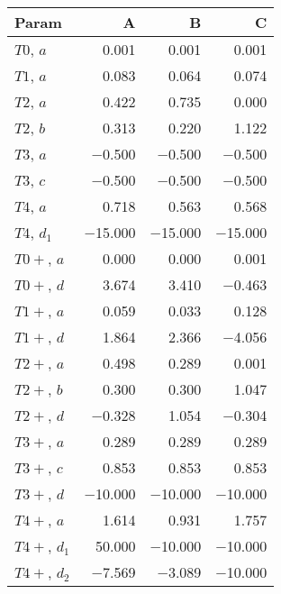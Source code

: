 \begin{tabular}{lrrr}
\toprule
 Param        &       A &       B &       C \\
\midrule
 $T0$, $a$    &   \num{0.001} &   \num{0.001} &   \num{0.001} \\
 $T1$, $a$    &   \num{0.083} &   \num{0.064} &   \num{0.074} \\
 $T2$, $a$    &   \num{0.422} &   \num{0.735} &   \num{0.000} \\
 $T2$, $b$    &   \num{0.313} &   \num{0.220} &   \num{1.122} \\
 $T3$, $a$    &  \num{-0.500} &  \num{-0.500} &  \num{-0.500} \\
 $T3$, $c$    &  \num{-0.500} &  \num{-0.500} &  \num{-0.500} \\
 $T4$, $a$    &   \num{0.718} &   \num{0.563} &   \num{0.568} \\
 $T4$, $d_1$  & \num{-15.000} & \num{-15.000} & \num{-15.000} \\
 $T0+$, $a$   &   \num{0.000} &   \num{0.000} &   \num{0.001} \\
 $T0+$, $d$   &   \num{3.674} &   \num{3.410} &  \num{-0.463} \\
 $T1+$, $a$   &   \num{0.059} &   \num{0.033} &   \num{0.128} \\
 $T1+$, $d$   &   \num{1.864} &   \num{2.366} &  \num{-4.056} \\
 $T2+$, $a$   &   \num{0.498} &   \num{0.289} &   \num{0.001} \\
 $T2+$, $b$   &   \num{0.300} &   \num{0.300} &   \num{1.047} \\
 $T2+$, $d$   &  \num{-0.328} &   \num{1.054} &  \num{-0.304} \\
 $T3+$, $a$   &   \num{0.289} &   \num{0.289} &   \num{0.289} \\
 $T3+$, $c$   &   \num{0.853} &   \num{0.853} &   \num{0.853} \\
 $T3+$, $d$   & \num{-10.000} & \num{-10.000} & \num{-10.000} \\
 $T4+$, $a$   &   \num{1.614} &   \num{0.931} &   \num{1.757} \\
 $T4+$, $d_1$ &  \num{50.000} & \num{-10.000} & \num{-10.000} \\
 $T4+$, $d_2$ &  \num{-7.569} &  \num{-3.089} & \num{-10.000} \\
\bottomrule
\end{tabular}
